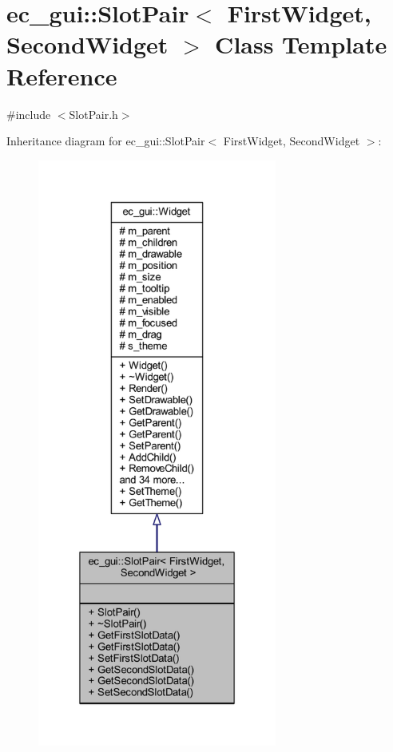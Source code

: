 \hypertarget{classec__gui_1_1_slot_pair}{}\section{ec\+\_\+gui\+:\+:Slot\+Pair$<$ First\+Widget, Second\+Widget $>$ Class Template Reference}
\label{classec__gui_1_1_slot_pair}


{\ttfamily \#include $<$Slot\+Pair.\+h$>$}



Inheritance diagram for ec\+\_\+gui\+:\+:Slot\+Pair$<$ First\+Widget, Second\+Widget $>$\+:\nopagebreak
\begin{figure}[H]
\begin{center}
\leavevmode
\includegraphics[height=550pt]{classec__gui_1_1_slot_pair__inherit__graph}
\end{center}
\end{figure}


